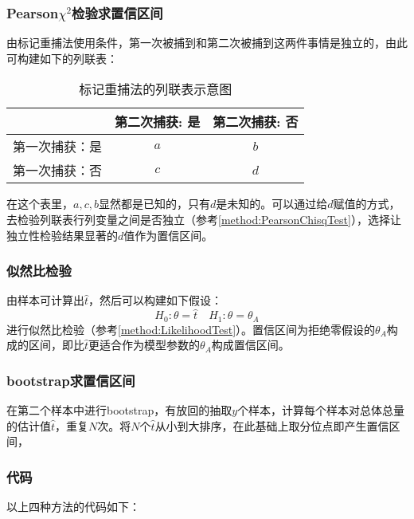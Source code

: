\subsubsection{Pearson$\chi^2$检验求置信区间}
由标记重捕法使用条件，第一次被捕到和第二次被捕到这两件事情是独立的，由此可构建如下的列联表：
\begin{table}[h!]
	\centering
	\begin{tabular}{@{}lcc@{}}
		\toprule
		& 第二次捕获: 是 & 第二次捕获: 否 \\ 
		\midrule
		第一次捕获：是    & $a$           & $b$           \\
		第一次捕获：否    & $c$           & $d$           \\ 
		\bottomrule
	\end{tabular}
	\caption{标记重捕法的列联表示意图}
\end{table}\par 
在这个表里，$a,c,b$显然都是已知的，只有$d$是未知的。可以通过给$d$赋值的方式，去检验列联表行列变量之间是否独立（参考\ref{method:PearsonChisqTest}），选择让独立性检验结果显著的$d$值作为置信区间。
\subsubsection{似然比检验}
由样本可计算出$\hat{t}$，然后可以构建如下假设：
\begin{equation*}
	H_0:\theta=\hat{t}\quad H_1:\theta=\theta_A
\end{equation*}
进行似然比检验（参考\ref{method:LikelihoodTest}）。置信区间为拒绝零假设的$\theta_A$构成的区间，即比$\hat{t}$更适合作为模型参数的$\theta_A$构成置信区间。
\subsubsection{bootstrap求置信区间}
在第二个样本中进行bootstrap，有放回的抽取$y$个样本，计算每个样本对总体总量的估计值$\hat{t}$，重复$N$次。将$N$个$\hat{t}$从小到大排序，在此基础上取分位点即产生置信区间，
\subsubsection{代码}
以上四种方法的代码如下：
\inputminted[bgcolor=white, linenos, frame=single, numbersep=5pt, breaklines]{r}{statistics/sampling-method/tag-recapture.R}
